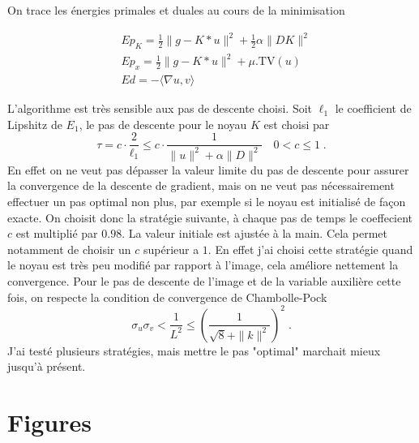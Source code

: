 \documentclass[a4paper]{article}
\begin{document}
On trace les énergies primales et duales au cours de la minimisation

\begin{align}
& Ep_K = \frac{1}{2} \| g - K * u\|^2 
+ \frac{1}{2} \alpha \| D K \|^2\\
& Ep_x = \frac{1}{2} \| g - K * u\|^2 
+ \mu. \text{TV} (u)  \\
& Ed = - \langle \nabla u ,v \rangle 
\end{align}

L'algorithme est très sensible aux pas de descente choisi.
Soit $\ell_1$ le coefficient de Lipshitz de $E_1$, le pas de descente pour le noyau $K$
est choisi par
\[
\tau = c \cdot \frac{2}{\ell_1} \leq  c \cdot \frac{1}{\|u\|^2 + \alpha \|D\|^2} \quad 0<c \leq 1 \; .
\]
En effet on ne veut pas dépasser la valeur limite du pas de descente pour assurer la convergence de la descente de gradient, mais on ne veut pas nécessairement effectuer un pas optimal non plus, par exemple si le noyau est initialisé de façon exacte.
On choisit donc la stratégie suivante, à chaque pas de temps le coeffecient $c$ est multiplié par $0.98$. La valeur initiale est ajustée à la main. Cela permet notamment de choisir un $c$ supérieur a $1$. En effet j'ai choisi cette stratégie quand le noyau est très peu modifié par rapport à l'image, cela améliore nettement la convergence.
Pour le pas de descente de l'image et de la variable auxilière cette fois, on respecte la condition de convergence de Chambolle-Pock
\[
\sigma_u \sigma_v <\frac{1}{L^2} \leq \left(\frac{1}{\sqrt{8} + \| k \|^2} \right)^2
\; .
\]
J'ai testé plusieurs stratégies, mais mettre le pas "optimal" marchait mieux jusqu'à présent.

\section{Figures}
\end{document}
